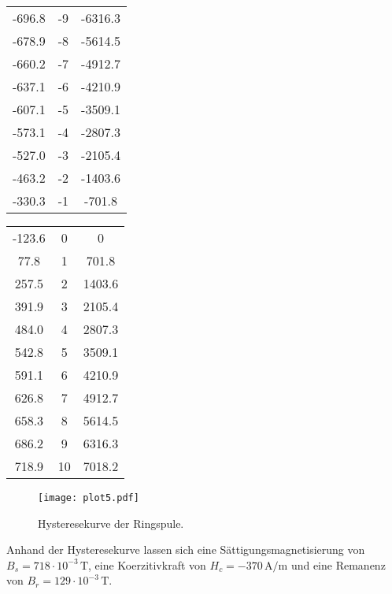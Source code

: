 \begin{table}
\begin{tabular}{c c c}
    -696.8 &  -9  &   -6316.3  \\
    -678.9 &  -8  &   -5614.5  \\
    -660.2 &  -7  &   -4912.7  \\
    -637.1 &  -6  &   -4210.9  \\
    -607.1 &  -5  &   -3509.1  \\
    -573.1 &  -4  &   -2807.3  \\
    -527.0 &  -3  &   -2105.4  \\
    -463.2 &  -2  &   -1403.6  \\
    -330.3 &  -1  &   -701.8   \\
    \bottomrule
  \end{tabular}
\end{table}


\begin{table}
  \centering

  \begin{tabular}{c c c}
    \toprule
    
    \midrule
    -123.6 &  0   &   0        \\
    77.8   &  1   &   701.8    \\
    257.5  & 2    &   1403.6   \\
    391.9  & 3    &   2105.4   \\
    484.0  & 4    &   2807.3   \\
    542.8  & 5    &   3509.1   \\
    591.1  & 6    &   4210.9   \\
    626.8  & 7    &   4912.7   \\
    658.3  & 8    &   5614.5   \\
    686.2  & 9    &   6316.3   \\
    718.9  & 10   &   7018.2   \\
    \bottomrule
  \end{tabular}
\end{table}


\begin{figure}
  \centering
  \texttt{[image: plot5.pdf]}
  \caption{Hysteresekurve der Ringspule.}
  \label{fig:Hysterese}
\end{figure}

Anhand der Hysteresekurve lassen sich eine Sättigungsmagnetisierung von $B_s = 718 \cdot 10^{-3} \, \unit{\tesla}$,
eine Koerzitivkraft von $H_c = -370 \, \unit{\ampere}/\unit{\m}$ und eine Remanenz von $B_r= 129 \cdot 10^{-3} \, \unit{\tesla}$.\\
